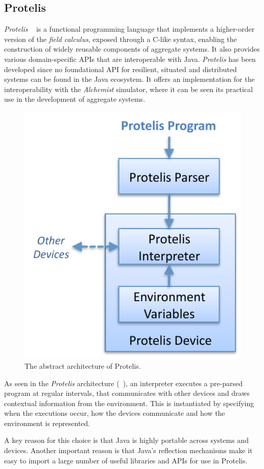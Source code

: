\subsection{Protelis}
\label{subsec:protelis}
\emph{Protelis} ~\cite{protelis} is a functional programming language that implements a higher-order version of the \emph{field calculus},
exposed through a C-like syntax, enabling the construction of widely reusable components of aggregate systems.
It also provides various domain-specific APIs that are interoperable with Java.
\emph{Protelis} has been developed since no foundational API for resilient, situated and distributed systems can be found
in the Java ecosystem.
It offers an implementation for the interoperability with the \emph{Alchemist} simulator, where it can be seen its
practical use in the development of aggregate systems.

\begin{figure}
    \centering
    \includegraphics[width=.5\linewidth]{figures/protelis-structure}
    \caption{The abstract architecture of Protelis.}
    \label{fig:protelis-structure}
\end{figure}

As seen in the \emph{Protelis} architecture (~), an interpreter executes a pre-parsed program at regular intervals,
that communicates with other devices and draws contextual information from the environment.
This is instantiated by specifying when the executions occur, how the devices communicate and how the environment is
represented.

A key reason for this choice is that Java is highly portable across systems and devices.
Another important reason is that Java's reflection mechanisms make it easy to import a large number of useful libraries
and APIs for use in Protelis.

